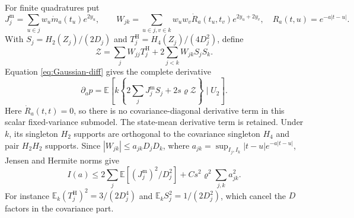 \documentclass[11pt,a4paper]{amsart}
\theoremstyle{plain}
\theoremstyle{definition}
\theoremstyle{remark}
\newcommand{\EE}{\mathbb{E}}
\begin{document}
For finite quadratures put
\[
 J_j^{\mathrm m}=\sum_{u\in j}w_u\dot m_a(t_u)e^{2y_u},\qquad
 W_{jk}=\sum_{u\in j,v\in k}w_uw_v\dot R_a(t_u,t_v)e^{2y_u+2y_v},
 \quad R_a(t,u)=e^{-a|t-u|}.
\]
With $S_j=H_2(Z_j)/(2D_j)$ and
$T_j^{\mathrm H}=H_4(Z_j)/(4D_j^2)$, define
\[
 \mathcal Z=\sum_jW_{jj}T_j^{\mathrm H}
                  +2\sum_{j<k}W_{jk}S_jS_k.
\]
Equation \eqref{eq:Gaussian-diff} gives the complete derivative
\begin{equation}\label{eq:a1-score}
 \partial_a p=\EE\left[k\left\{2\sum_jJ_j^{\mathrm m}S_j
                              +2s\varrho\mathcal Z\right\}\mid U_2\right].
\end{equation}
Here $\dot R_a(t,t)=0$, so there is no covariance-diagonal derivative
term in this scalar fixed-variance submodel. The state-mean derivative
term is retained. Under $k$, its singleton $H_2$ supports are orthogonal
to the covariance singleton $H_4$ and pair $H_2H_2$ supports. Since
$|W_{jk}|\le a_{jk}D_jD_k$, where
$a_{jk}=\sup_{I_j,I_k}|t-u|e^{-a|t-u|}$, Jensen and Hermite norms give
\begin{equation}\label{eq:a1-information}
 I(a)\le2\sum_j\EE[(J_j^{\mathrm m})^2/D_j^2]
                         +Cs^2\varrho^2\sum_{j,k}a_{jk}^2.
\end{equation}
For instance $\EE_k(T_j^{\mathrm H})^2=3/(2D_j^4)$ and
$\EE_k S_j^2=1/(2D_j^2)$, which cancel the $D$ factors in the covariance
part.
\end{document}
